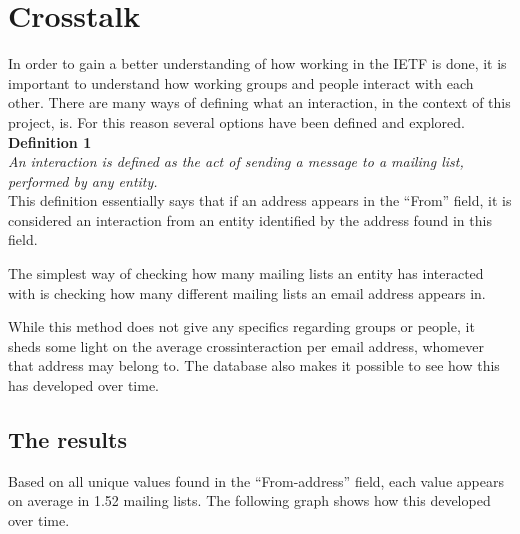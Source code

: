 \documentclass[a4paper,english]{report}
\begin{document}
\section{Crosstalk}

In order to gain a better understanding of how working in the IETF is done, it is important to understand how working groups and people interact with each other.
There are many ways of defining what an interaction, in the context of this project, is.
For this reason several options have been defined and explored.\\

\noindent
\textbf{Definition 1} \\

\textit{An interaction is defined as the act of sending a message to a mailing list, performed by any entity.}\\

This definition essentially says that if an address appears in the “From” field, it is considered an interaction from an entity identified by the address found in this field.

The simplest way of checking how many mailing lists an entity has interacted with  is checking how many different mailing lists an email address appears in. 

While this method does not give any specifics regarding groups or people, it sheds some light on the average crossinteraction per email address, whomever that address may belong to. The database also makes it possible to see how this has developed over time.

\subsection{The results}

Based on all unique values found in the “From-address” field, each value appears on average in 1.52 mailing lists.
The following graph shows how this developed over time.
\end{document}
